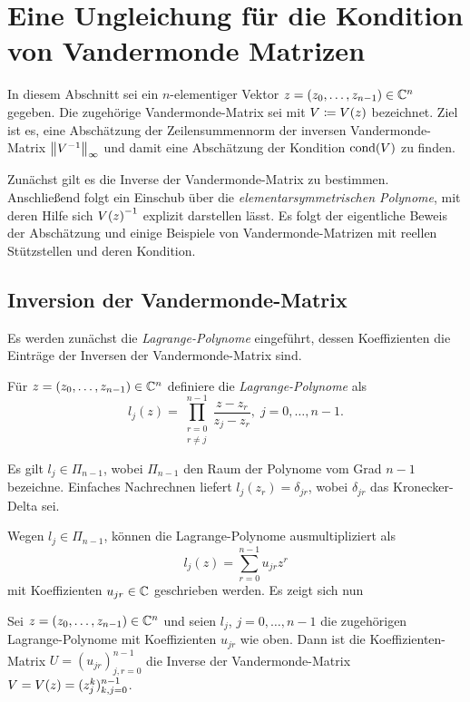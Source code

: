 \chapter{Eine Ungleichung für die Kondition von Vandermonde Matrizen}
In diesem Abschnitt sei ein $n$-elementiger Vektor $z = (z_0, \dots, z_{n-1})
\in \mathbb{C}^n$ gegeben.  Die zugehörige Vandermonde-Matrix sei mit $V \coloneqq
\text{$V(z)$}$ bezeichnet.  Ziel ist es, eine Abschätzung der Zeilensummennorm der
inversen Vandermonde-Matrix $\left\lVert V^{-1} \right\rVert_{\infty}$ und damit eine Abschätzung der
Kondition $\text{cond$(V)$}$ zu finden.

Zunächst gilt es die Inverse der Vandermonde-Matrix zu bestimmen. Anschließend
folgt ein Einschub über die \emph{elementarsymmetrischen Polynome}, mit deren
Hilfe sich $\text{$V(z)$}^{-1}$ explizit darstellen lässt. Es folgt der eigentliche
Beweis der Abschätzung und einige Beispiele von Vandermonde-Matrizen mit
reellen Stützstellen und deren Kondition.

\section{Inversion der Vandermonde-Matrix}
Es werden zunächst die \emph{Lagrange-Polynome} eingeführt, dessen
Koeffizienten die Einträge der Inversen der Vandermonde-Matrix sind.

\begin{mydef}
    Für $ z = (z_0, \dots, z_{n-1}) \in \mathbb{C}^n $ definiere die
    \emph{Lagrange-Polynome} als
    \[
        l_j(z) = \prod_{\substack{r=0\\ r \neq j}}^{n-1} \frac{z - z_r}{z_j - z_r}, \; j = 0, \dots, n-1.
    \]
\end{mydef}

\begin{remark}
    Es gilt $l_j \in \Pi_{n-1}$, wobei $\Pi_{n-1}$ den Raum der Polynome vom
    Grad $n-1$ bezeichne.  Einfaches Nachrechnen liefert
    $l_j(z_r) = \delta_{jr}$, wobei $\delta_{jr}$ das Kronecker-Delta
    sei.
\end{remark}

Wegen $l_j \in \Pi_{n-1}$, können die Lagrange-Polynome ausmultipliziert als
\begin{equation}
    \label{eq:lagrange}
    l_j(z) = \sum_{r = 0}^{n-1} u_{jr} z^{r}
\end{equation}
mit Koeffizienten $u_{jr} \in \mathbb{C}$ geschrieben werden.
Es zeigt sich nun

\begin{lemma}
    Sei $z = (z_0, \dots, z_{n-1}) \in \mathbb{C}^n$ und seien
    $l_j$, $j = 0, \dots, n-1$ die zugehörigen Lagrange-Polynome
    mit Koeffizienten $u_{jr}$ wie oben.
    Dann ist die Koeffizienten-Matrix $U = (u_{jr})_{j,r = 0}^{n-1}$ die
    Inverse der Vandermonde-Matrix $V = \text{$V(z)$} = (z_{j}^{k})_{k,j = 0}^{n-1}$.
\end{lemma}


